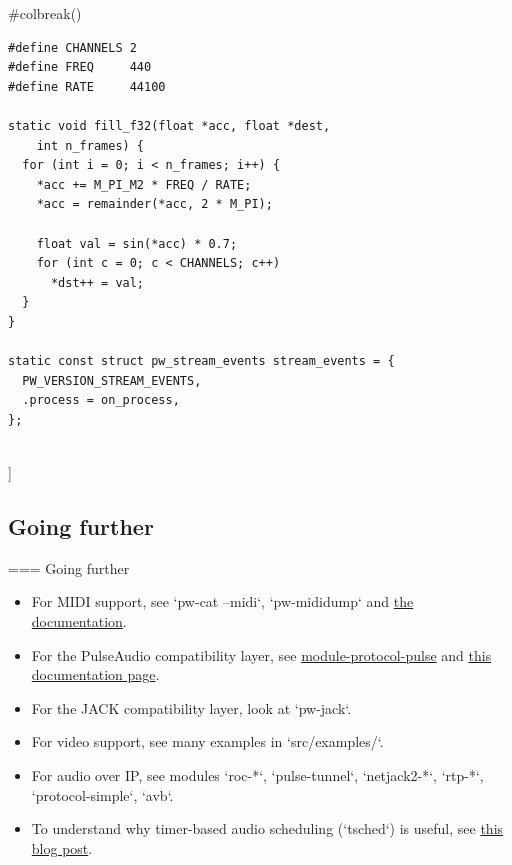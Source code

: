      #colbreak()
      \begin{block}{}
        \fontsize{8}{8}\selectfont
          \begin{verbatim}
#define CHANNELS 2
#define FREQ     440
#define RATE     44100

static void fill_f32(float *acc, float *dest,
    int n_frames) {
  for (int i = 0; i < n_frames; i++) {
    *acc += M_PI_M2 * FREQ / RATE;
    *acc = remainder(*acc, 2 * M_PI);

    float val = sin(*acc) * 0.7;
    for (int c = 0; c < CHANNELS; c++)
      *dst++ = val;
  }
}

static const struct pw_stream_events stream_events = {
  PW_VERSION_STREAM_EVENTS,
  .process = on_process,
};
          \end{verbatim}
        \end{block}
  \\]




\subsection{Going further}



=== {Going further}
  \begin{itemize}

  \item For MIDI support, see `pw-cat --midi`, `pw-mididump`
    and \href{https://docs.pipewire.org/page_midi.html}{the documentation}.

  \item For the PulseAudio compatibility layer, see
    \href{https://docs.pipewire.org/page_module_protocol_pulse.html}{module-protocol-pulse}
    and
    \href{https://docs.pipewire.org/page_pulseaudio.html}{this documentation page}.

  \item For the JACK compatibility layer, look at `pw-jack`.

  \item For video support, see many examples in `src/examples/`.

  \item For audio over IP, see modules `roc-*`, `pulse-tunnel`,
    `netjack2-*`, `rtp-*`, `protocol-simple`, `avb`.

  \item To understand why timer-based audio scheduling (`tsched`) is
    useful, see
    \href{https://0pointer.net/blog/projects/pulse-glitch-free.html}{this blog post}.

  \end{itemize}

